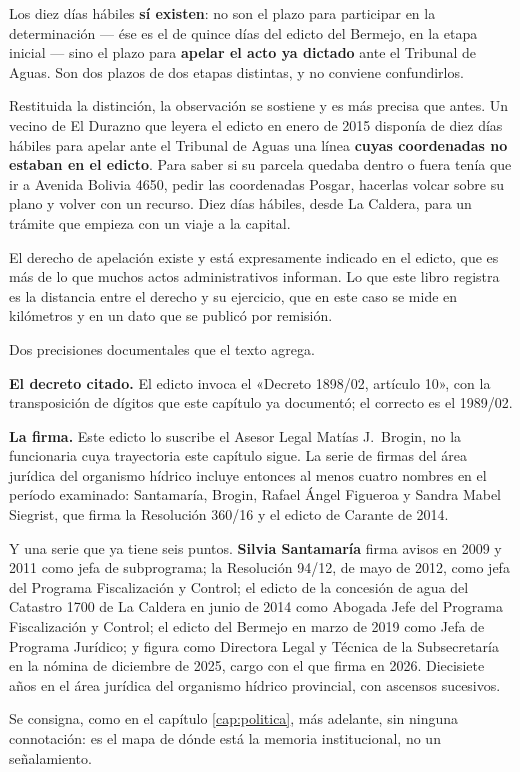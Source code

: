 Los diez días hábiles \textbf{sí existen}: no son el plazo para participar en la determinación --- ése es el de quince días del edicto del Bermejo, en la etapa inicial --- sino el plazo para \textbf{apelar el acto ya dictado} ante el Tribunal de Aguas. Son dos plazos de dos etapas distintas, y no conviene confundirlos.

Restituida la distinción, la observación se sostiene y es más precisa que antes. Un vecino de El Durazno que leyera el edicto en enero de 2015 disponía de diez días hábiles para apelar ante el Tribunal de Aguas una línea \textbf{cuyas coordenadas no estaban en el edicto}. Para saber si su parcela quedaba dentro o fuera tenía que ir a Avenida Bolivia 4650, pedir las coordenadas Posgar, hacerlas volcar sobre su plano y volver con un recurso. Diez días hábiles, desde La Caldera, para un trámite que empieza con un viaje a la capital.

El derecho de apelación existe y está expresamente indicado en el edicto, que es más de lo que muchos actos administrativos informan. Lo que este libro registra es la distancia entre el derecho y su ejercicio, que en este caso se mide en kilómetros y en un dato que se publicó por remisión.

\begin{cautela}
Dos precisiones documentales que el texto agrega.

\textbf{El decreto citado.} El edicto invoca el «Decreto 1898/02, artículo 10», con la transposición de dígitos que este capítulo ya documentó; el correcto es el 1989/02.

\textbf{La firma.} Este edicto lo suscribe el Asesor Legal Matías J.\ Brogin, no la funcionaria cuya trayectoria este capítulo sigue. La serie de firmas del área jurídica del organismo hídrico incluye entonces al menos cuatro nombres en el período examinado: Santamaría, Brogin, Rafael Ángel Figueroa y Sandra Mabel Siegrist, que firma la Resolución 360/16 y el edicto de Carante de 2014.
\end{cautela}

Y una serie que ya tiene seis puntos. \textbf{Silvia Santamaría} firma avisos en 2009 y 2011 como jefa de subprograma; la Resolución 94/12, de mayo de 2012, como jefa del Programa Fiscalización y Control; el edicto de la concesión de agua del Catastro 1700 de La Caldera en junio de 2014 como Abogada Jefe del Programa Fiscalización y Control; el edicto del Bermejo en marzo de 2019 como Jefa de Programa Jurídico; y figura como Directora Legal y Técnica de la Subsecretaría en la nómina de diciembre de 2025, cargo con el que firma en 2026. Diecisiete años en el área jurídica del organismo hídrico provincial, con ascensos sucesivos.

Se consigna, como en el capítulo \ref{cap:politica}, más adelante, sin ninguna connotación: es el mapa de dónde está la memoria institucional, no un señalamiento.
